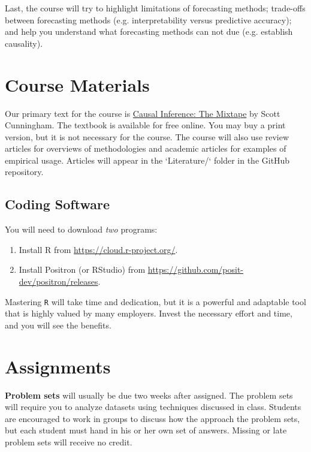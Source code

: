 \documentclass[12pt]{article}
\begin{document}
Last, the course will try to highlight limitations of forecasting methods; trade-offs between forecasting methods (e.g. interpretability versus predictive accuracy); and help you understand what forecasting methods can not due (e.g. establish causality). 


\section*{Course Materials}

Our primary text for the course is \href{https://mixtape.scunning.com/}{Causal Inference: The Mixtape} by Scott Cunningham. The textbook is available for free online. You may buy a print version, but it is not necessary for the course. The course will also use review articles for overviews of methodologies and academic articles for examples of empirical usage. Articles will appear in the `Literature/` folder in the GitHub repository.

\subsection*{Coding Software}

You will need to download \emph{two} programs:
\begin{enumerate}
  \item Install R from \url{https://cloud.r-project.org/}.
  \item Install Positron (or RStudio) from \url{https://github.com/posit-dev/positron/releases}. 
\end{enumerate}

\bigskip
Mastering \texttt{R} will take time and dedication, but it is a powerful and adaptable tool that is highly valued by many employers. Invest the necessary effort and time, and you will see the benefits.



\section*{Assignments}

\textbf{Problem sets} will usually be due two weeks after assigned. 
The problem sets will require you to analyze datasets using techniques discussed in class. 
Students are encouraged to work in groups to discuss how the approach the problem sets, but each student must hand in his or her own set of answers. 
Missing or late problem sets will receive no credit.
\end{document}
